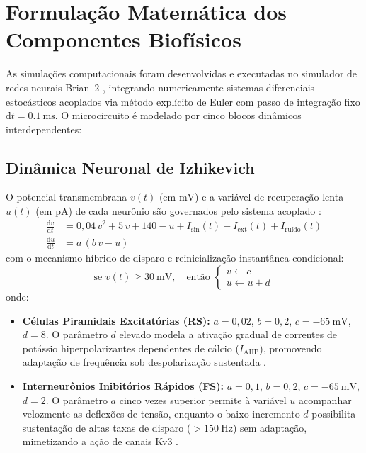 \documentclass[12pt,openright,oneside,a4paper,brazil]{abntex2}
\begin{document}
\section{Formulação Matemática dos Componentes Biofísicos}

As simulações computacionais foram desenvolvidas e executadas no simulador de redes neurais \textsf{Brian~2} \cite{stimberg2019}, integrando numericamente sistemas diferenciais estocásticos acoplados via método explícito de Euler com passo de integração fixo $\mathrm{d}t = \qty{0.1}{\milli\second}$. O microcircuito é modelado por cinco blocos dinâmicos interdependentes:

\subsection{Dinâmica Neuronal de Izhikevich}
O potencial transmembrana $v(t)$ (em $\unit{\milli\volt}$) e a variável de recuperação lenta $u(t)$ (em $\unit{\pico\ampere}$) de cada neurônio são governados pelo sistema acoplado \cite{izhikevich2003}:
\begin{align}
    \frac{\mathrm{d}v}{\mathrm{d}t} & = 0{,}04\,v^2 + 5\,v + 140 - u + I_{\text{sin}}(t) + I_{\text{ext}}(t) + I_{\text{ruído}}(t) \label{eq:izh_v} \\
    \frac{\mathrm{d}u}{\mathrm{d}t} & = a\,(b\,v - u) \label{eq:izh_u}
\end{align}
com o mecanismo híbrido de disparo e reinicialização instantânea condicional:
\begin{equation}
    \text{se } v(t) \ge \qty{30}{\milli\volt}, \quad \text{então } \begin{cases} v \leftarrow c \\ u \leftarrow u + d \end{cases} \label{eq:izh_reset}
\end{equation}
onde:
\begin{itemize}
    \item \textbf{Células Piramidais Excitatórias (RS):} $a = 0{,}02$, $b = 0{,}2$, $c = \qty{-65}{\milli\volt}$, $d = 8$. O parâmetro $d$ elevado modela a ativação gradual de correntes de potássio hiperpolarizantes dependentes de cálcio ($I_{\text{AHP}}$), promovendo adaptação de frequência sob despolarização sustentada \cite{izhikevich2007}.
    \item \textbf{Interneurônios Inibitórios Rápidos (FS):} $a = 0{,}1$, $b = 0{,}2$, $c = \qty{-65}{\milli\volt}$, $d = 2$. O parâmetro $a$ cinco vezes superior permite à variável $u$ acompanhar velozmente as deflexões de tensão, enquanto o baixo incremento $d$ possibilita sustentação de altas taxas de disparo ($> \qty{150}{\hertz}$) sem adaptação, mimetizando a ação de canais Kv3 \cite{buzsaki2006, kandel2021}.
\end{itemize}
\end{document}
